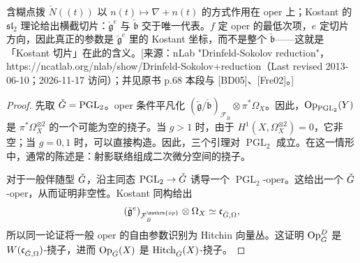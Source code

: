 \begin{transnote}{含糊点拨}
$\check N((t))$ 以 $n(t)\mapsto\nabla+n(t)$ 的方式作用在 oper 上；Kostant 的 $\mathfrak{sl}_2$ 理论给出横截切片：$\check{\mathfrak g}^{e}$ 与 $\check{\mathfrak b}$ 交于唯一代表。$f$ 定 oper 的最低次项，$e$ 定切片方向，因此真正的参数是 $\check{\mathfrak g}^{e}$ 里的 Kostant 坐标，而不是整个 $\check{\mathfrak b}$——这就是「Kostant 切片」在此的含义。[来源：nLab "Drinfeld-Sokolov reduction"，https://ncatlab.org/nlab/show/Drinfeld-Sokolov+reduction（Last revised 2013-06-10；2026-11-17 访问）；并见原书 p.68 本段与 [BD05]、[Fre02]。]
\end{transnote}
\begin{proof}

先取 $\check{G}=\operatorname{PGL}_2$。oper 条件平凡化 $(\check{\mathfrak g}/\check{\mathfrak b})_{\mathcal F_{\check B}}\otimes\pi^*\Omega_X$。因此，$\operatorname{Op}_{\operatorname{PGL}_2}(Y)$ 是 $\pi^*\Omega_X^{\otimes2}$ 的一个可能为空的挠子。当 $g>1$ 时，由于 $H^1(X,\Omega_X^{\otimes2})=0$，它非空；当 $g=0,1$ 时，可以直接构造。因此，三个引理对 $\operatorname{PGL}_2$ 成立。在这一情形中，通常的陈述是：射影联络组成二次微分空间的挠子。

对于一般伴随型 $\check{G}$，沿主同态 $\operatorname{PGL}_2\to\check{G}$ 诱导一个 $\operatorname{PGL}_2$-oper。这给出一个 $\check{G}$-oper，从而证明非空性。Kostant 同构给出
\[(\check{\mathfrak g}^{e})_{\mathcal F^{\mathrm{op}}_{\check B}}\otimes\Omega_X\simeq\mathfrak c_{\checkG,\Omega},\]
所以同一论证将一般 oper 的自由参数识别为 Hitchin 向量丛。这证明 $\operatorname{Op}^D_{\check{G}}$ 是 $W(\mathfrak c_{\check{G},\Omega})$-挠子，进而 $\operatorname{Op}_{\check{G}}(X)$ 是 $\operatorname{Hitch}_{\check{G}}(X)$-挠子。
\end{proof}

